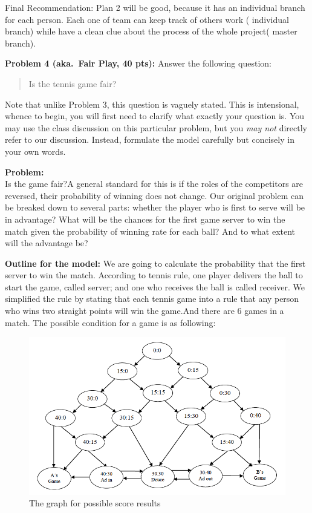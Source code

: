 \documentclass[12pt]{article}
\begin{document}
Final Recommendation: Plan 2 will be good, because it has an individual branch for each person. Each one of team can keep track of others work ( individual branch) while have a clean clue about the process of the whole project( master branch).



\vskip0.25in
\noindent\textbf{Problem 4 (aka.\ Fair Play, 40 pts):}
Answer the following question:
\begin{verse}
Is the tennis game fair?
\end{verse}
Note that unlike Problem 3, this question is vaguely stated.
This is intensional, whence to begin, you will first need to clarify
what exactly your question is.
You may use the class discussion on this particular 
problem, but you \emph{may not} directly refer to our 
discussion.  Instead, formulate the model carefully but concisely in 
your own words.   

\vskip0.25in

\noindent\textbf{Problem:}  
\\ Is the game fair?A general standard for this is if the roles of the competitors are reversed, their probability of
winning does not change. Our original problem can be breaked down to several parts: whether the player who is first to serve will be in advantage?  What will be the chances for the first game server to win the match given the probability of winning rate for each ball? And to what extent will the advantage be?

\noindent\textbf{Outline for the model:}   We are going to calculate the probability that the first server to win the match. According to tennis rule, one player delivers the ball to start the game, called server; and one who receives the ball is called receiver. We simplified the rule by stating that each tennis game into a rule that any person who wins two straight points will win the game.And there are 6 games in a match. The possible condition for a game is as following:

\begin{figure}[h]
    \begin{center}
        \includegraphics[scale=0.6]{graph2.png}
    \end{center}
    \caption{The graph for possible score results}
    \label{fig:branch}
\end{figure}
\end{document}

